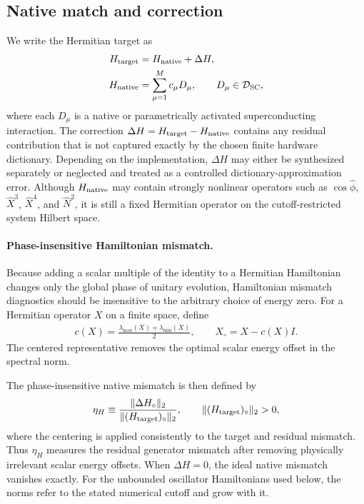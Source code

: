\documentclass[pra,twocolumn,superscriptaddress,nofootinbib,floatfix]{revtex4-2}
\theoremstyle{remark}
\begin{document}
\subsection{Native match and correction}
\label{subsec:native-match}

We write the Hermitian target as
\begin{align}
H_{\rm target}&=H_{\rm native}+\Delta H,\nonumber\\
H_{\rm native}&=\sum_{\mu=1}^{M}c_{\mu}D_{\mu},\qquad D_{\mu}\in\mathcal D_{\rm SC},
\label{eq:native-hamiltonian-dictionary}
\end{align}
where each \(D_{\mu}\) is a native or parametrically activated superconducting interaction. The correction \(\Delta H=H_{\rm target}-H_{\rm native}\) contains any residual contribution that is not captured exactly by the chosen finite hardware dictionary. Depending on the implementation, \(\Delta H\) may either be synthesized separately or neglected and treated as a controlled dictionary-approximation error. Although \(H_{\rm native}\) may contain strongly nonlinear operators such as \(\cos\hat\phi\), \(\hat X^3\), \(\hat X^4\), and \(\hat N^2\), it is still a fixed Hermitian operator on the cutoff-restricted system Hilbert space.

\paragraph{Phase-insensitive Hamiltonian mismatch.}
Because adding a scalar multiple of the identity to a Hermitian Hamiltonian changes only the global phase of unitary evolution, Hamiltonian mismatch diagnostics should be insensitive to the arbitrary choice of energy zero. For a Hermitian operator \(X\) on a finite space, define
\begin{align}
c(X)=\frac{\lambda_{\max}(X)+\lambda_{\min}(X)}{2},\qquad X_\circ=X-c(X)I .
\label{eq:energy-zero-convention}
\end{align}
The centered representative removes the optimal scalar energy offset in the spectral norm.

The phase-insensitive native mismatch is then defined by
\begin{align}
\eta_H\equiv\frac{\|\Delta H_\circ\|_2}{\|(H_{\rm target})_\circ\|_2},\qquad\|(H_{\rm target})_\circ\|_2>0,
\label{eq:phase-invariant-eta}
\end{align}
where the centering is applied consistently to the target and residual mismatch. Thus \(\eta_H\) measures the residual generator mismatch after removing physically irrelevant scalar energy offsets. When \(\Delta H=0\), the ideal native mismatch vanishes exactly. For the unbounded oscillator Hamiltonians used below, the norms refer to the stated numerical cutoff and grow with it.
\end{document}
